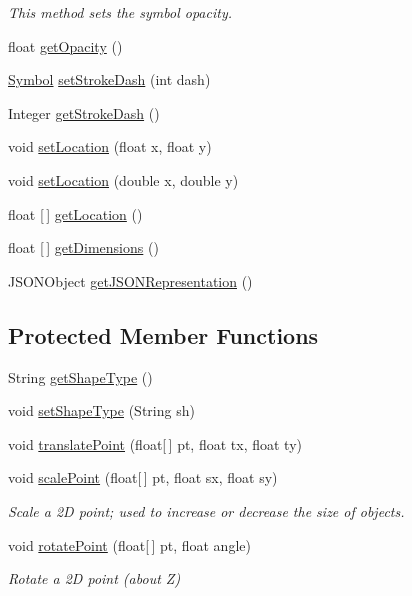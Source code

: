 \begin{DoxyCompactItemize}
\begin{DoxyCompactList}\small\item\em This method sets the symbol opacity. \end{DoxyCompactList}\item 
float \hyperlink{classbridges_1_1base_1_1_symbol_af249b2a8a11a70edc8f51ee19e6cd927}{get\+Opacity} ()
\item 
\hyperlink{classbridges_1_1base_1_1_symbol}{Symbol} \hyperlink{classbridges_1_1base_1_1_symbol_ad36224ec7cb588dbbaa8040ef59ffbfc}{set\+Stroke\+Dash} (int dash)
\item 
Integer \hyperlink{classbridges_1_1base_1_1_symbol_a31ff460ae6b24ed968c1045e2533a967}{get\+Stroke\+Dash} ()
\item 
void \hyperlink{classbridges_1_1base_1_1_symbol_a168cea9fd50ad311fe9c74215ab708ac}{set\+Location} (float x, float y)
\item 
void \hyperlink{classbridges_1_1base_1_1_symbol_af4099c07f8d160321b48643512073591}{set\+Location} (double x, double y)
\item 
float \mbox{[}$\,$\mbox{]} \hyperlink{classbridges_1_1base_1_1_symbol_a67d925fa6fcf9b78c449b63182029e56}{get\+Location} ()
\item 
float \mbox{[}$\,$\mbox{]} \hyperlink{classbridges_1_1base_1_1_symbol_a6cf741f603dd6347325e95a2b4d13d2e}{get\+Dimensions} ()
\item 
J\+S\+O\+N\+Object \hyperlink{classbridges_1_1base_1_1_symbol_aeba4cfa5b39fe03e72a568a8b7452e60}{get\+J\+S\+O\+N\+Representation} ()
\end{DoxyCompactItemize}
\subsection*{Protected Member Functions}
\begin{DoxyCompactItemize}
\item 
String \hyperlink{classbridges_1_1base_1_1_symbol_a10f3cde5331f1af9303b08249e719a9d}{get\+Shape\+Type} ()
\item 
void \hyperlink{classbridges_1_1base_1_1_symbol_adf9559ecef8902f83cbb6bbefdf1c601}{set\+Shape\+Type} (String sh)
\item 
void \hyperlink{classbridges_1_1base_1_1_symbol_affb384e1e7e22d7bcb6ca0bf0d4ebbc3}{translate\+Point} (float\mbox{[}$\,$\mbox{]} pt, float tx, float ty)
\item 
void \hyperlink{classbridges_1_1base_1_1_symbol_a17d2845ca2742971f977cc5be847b786}{scale\+Point} (float\mbox{[}$\,$\mbox{]} pt, float sx, float sy)
\begin{DoxyCompactList}\small\item\em Scale a 2D point; used to increase or decrease the size of objects. \end{DoxyCompactList}\item 
void \hyperlink{classbridges_1_1base_1_1_symbol_affed9d5b28b0643d3b94d3fb3c7b6858}{rotate\+Point} (float\mbox{[}$\,$\mbox{]} pt, float angle)
\begin{DoxyCompactList}\small\item\em Rotate a 2D point (about Z) \end{DoxyCompactList}\end{DoxyCompactItemize}
